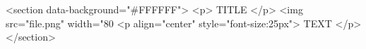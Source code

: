 <section data-background="#FFFFFF">
    <p> TITLE </p> 
        <img src="file.png" width="80%
        <p align="center" style="font-size:25px">  
            TEXT        
        </p>
</section>

